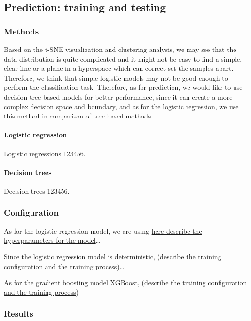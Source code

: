 \documentclass{article}
\begin{document}
\subsection{Prediction: training and testing}

\subsubsection*{Methods}

Based on the t-SNE visualization and clustering analysis, we may see that the data distribution is quite complicated and it might not be easy to find a simple, clear line or a plane in a hyperspace which can correct set the samples apart. Therefore, we think that simple logistic models may not be good enough to perform the classification task.  Therefore, as for prediction, we would like to use decision tree based models for better performance, since it can create a more complex decision space and boundary, and as for the logistic regression, we use this method in comparison of tree based methods.

\paragraph{Logistic regression} Logistic regressions 123456.

\paragraph{Decision trees} Decision trees 123456.

\subsubsection{Configuration}

As for the logistic regression model, we are using \underline{here describe the hyperparameters for the model}\ldots

Since the logistic regression model is deterministic, \underline{(describe the training configuration and the training process)}\ldots.

As for the gradient boosting model XGBoost, \underline{(describe the training configuration and the training process)}

\subsubsection*{Results}


\end{document}
